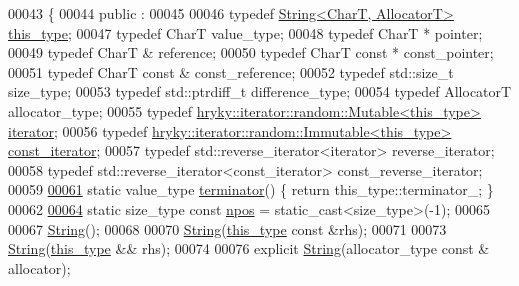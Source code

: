 \begin{DoxyCode}
00043 \{
00044 \textcolor{keyword}{public} :
00045 
00046     \textcolor{keyword}{typedef} \hyperlink{classhryky_1_1_string}{String<CharT, AllocatorT>} \hyperlink{classhryky_1_1_string}{this_type};
00047     \textcolor{keyword}{typedef} CharT value\_type;
00048     \textcolor{keyword}{typedef} CharT * pointer;
00049     \textcolor{keyword}{typedef} CharT & reference;
00050     \textcolor{keyword}{typedef} CharT \textcolor{keyword}{const} * const\_pointer;
00051     \textcolor{keyword}{typedef} CharT \textcolor{keyword}{const} & const\_reference;
00052     \textcolor{keyword}{typedef} std::size\_t size\_type;
00053     \textcolor{keyword}{typedef} std::ptrdiff\_t difference\_type;
00054     \textcolor{keyword}{typedef} AllocatorT allocator\_type;
00055     \textcolor{keyword}{typedef} \hyperlink{classhryky_1_1iterator_1_1random_1_1_mutable}{hryky::iterator::random::Mutable<this_type>} \hyperlink{classhryky_1_1iterator_1_1random_1_1_mutable}{iterator};
00056     \textcolor{keyword}{typedef} \hyperlink{classhryky_1_1iterator_1_1random_1_1_immutable}{hryky::iterator::random::Immutable<this_type>} \hyperlink{classhryky_1_1iterator_1_1random_1_1_immutable}{const_iterator};
00057     \textcolor{keyword}{typedef} std::reverse\_iterator<iterator> reverse\_iterator;
00058     \textcolor{keyword}{typedef} std::reverse\_iterator<const\_iterator> const\_reverse\_iterator;
00059 
\hypertarget{string_8h_source_l00061}{}\hyperlink{classhryky_1_1_string_ab1308696e8665314373d9aec581a3095}{00061}     \textcolor{keyword}{static} value\_type \hyperlink{classhryky_1_1_string_ab1308696e8665314373d9aec581a3095}{terminator}() \{ \textcolor{keywordflow}{return} this\_type::terminator\_; \}
00062 
\hypertarget{string_8h_source_l00064}{}\hyperlink{classhryky_1_1_string_a63a5477108395a8682a8fd4a03addc43}{00064}     \textcolor{keyword}{static} size\_type \textcolor{keyword}{const} \hyperlink{classhryky_1_1_string_a63a5477108395a8682a8fd4a03addc43}{npos} = \textcolor{keyword}{static\_cast<}size\_type\textcolor{keyword}{>}(-1);
00065 
00067     \hyperlink{classhryky_1_1_string_ad60595ccc01ad3a9c1c32b9c7eb0a115}{String}();
00068 
00070     \hyperlink{classhryky_1_1_string_ad60595ccc01ad3a9c1c32b9c7eb0a115}{String}(\hyperlink{classhryky_1_1_string}{this_type} \textcolor{keyword}{const} &rhs);
00071 
00073     \hyperlink{classhryky_1_1_string_ad60595ccc01ad3a9c1c32b9c7eb0a115}{String}(\hyperlink{classhryky_1_1_string}{this_type} && rhs);
00074 
00076     \textcolor{keyword}{explicit} \hyperlink{classhryky_1_1_string_ad60595ccc01ad3a9c1c32b9c7eb0a115}{String}(allocator\_type \textcolor{keyword}{const} & allocator);

\end{DoxyCode}
